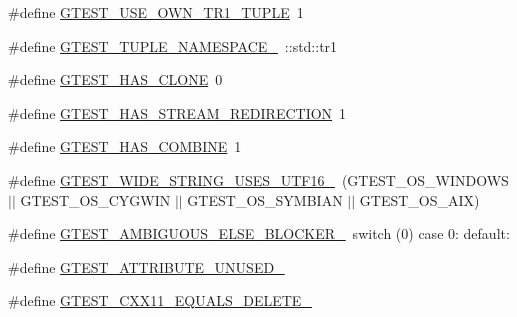 \begin{DoxyCompactItemize}
\#define \mbox{\hyperlink{_obj__test_2lib_2googletest-release-1_88_81_2googletest_2include_2gtest_2internal_2gtest-port_8h_afa144e5f5d039db0df873e7ad48c1fda}{G\+T\+E\+S\+T\+\_\+\+U\+S\+E\+\_\+\+O\+W\+N\+\_\+\+T\+R1\+\_\+\+T\+U\+P\+LE}}~1
\item 
\#define \mbox{\hyperlink{_obj__test_2lib_2googletest-release-1_88_81_2googletest_2include_2gtest_2internal_2gtest-port_8h_a2023f59bfbd8fb7148262a63bdbf0b01}{G\+T\+E\+S\+T\+\_\+\+T\+U\+P\+L\+E\+\_\+\+N\+A\+M\+E\+S\+P\+A\+C\+E\+\_\+}}~\+::std\+::tr1
\item 
\#define \mbox{\hyperlink{_obj__test_2lib_2googletest-release-1_88_81_2googletest_2include_2gtest_2internal_2gtest-port_8h_a40c075a7f969a694e59532356be59fd5}{G\+T\+E\+S\+T\+\_\+\+H\+A\+S\+\_\+\+C\+L\+O\+NE}}~0
\item 
\#define \mbox{\hyperlink{_obj__test_2lib_2googletest-release-1_88_81_2googletest_2include_2gtest_2internal_2gtest-port_8h_add695166eb7b691f93777525d5881062}{G\+T\+E\+S\+T\+\_\+\+H\+A\+S\+\_\+\+S\+T\+R\+E\+A\+M\+\_\+\+R\+E\+D\+I\+R\+E\+C\+T\+I\+ON}}~1
\item 
\#define \mbox{\hyperlink{_obj__test_2lib_2googletest-release-1_88_81_2googletest_2include_2gtest_2internal_2gtest-port_8h_a91a068d3bf6855b6f399f01836ae1482}{G\+T\+E\+S\+T\+\_\+\+H\+A\+S\+\_\+\+C\+O\+M\+B\+I\+NE}}~1
\item 
\#define \mbox{\hyperlink{_obj__test_2lib_2googletest-release-1_88_81_2googletest_2include_2gtest_2internal_2gtest-port_8h_a0e3904ca8d62334ab5f29c057dceb6a1}{G\+T\+E\+S\+T\+\_\+\+W\+I\+D\+E\+\_\+\+S\+T\+R\+I\+N\+G\+\_\+\+U\+S\+E\+S\+\_\+\+U\+T\+F16\+\_\+}}~(G\+T\+E\+S\+T\+\_\+\+O\+S\+\_\+\+W\+I\+N\+D\+O\+WS $\vert$$\vert$ G\+T\+E\+S\+T\+\_\+\+O\+S\+\_\+\+C\+Y\+G\+W\+IN $\vert$$\vert$ G\+T\+E\+S\+T\+\_\+\+O\+S\+\_\+\+S\+Y\+M\+B\+I\+AN $\vert$$\vert$ G\+T\+E\+S\+T\+\_\+\+O\+S\+\_\+\+A\+IX)
\item 
\#define \mbox{\hyperlink{_obj__test_2lib_2googletest-release-1_88_81_2googletest_2include_2gtest_2internal_2gtest-port_8h_a00b3684a621ce1422b55a0e7e8a6aecb}{G\+T\+E\+S\+T\+\_\+\+A\+M\+B\+I\+G\+U\+O\+U\+S\+\_\+\+E\+L\+S\+E\+\_\+\+B\+L\+O\+C\+K\+E\+R\+\_\+}}~switch (0) case 0\+: default\+:
\item 
\#define \mbox{\hyperlink{_obj__test_2lib_2googletest-release-1_88_81_2googletest_2include_2gtest_2internal_2gtest-port_8h_acdd47601a9376161c349a5881ccc6918}{G\+T\+E\+S\+T\+\_\+\+A\+T\+T\+R\+I\+B\+U\+T\+E\+\_\+\+U\+N\+U\+S\+E\+D\+\_\+}}
\item 
\#define \mbox{\hyperlink{_obj__test_2lib_2googletest-release-1_88_81_2googletest_2include_2gtest_2internal_2gtest-port_8h_ab229f1a8ec704ba6a97918f9239547c4}{G\+T\+E\+S\+T\+\_\+\+C\+X\+X11\+\_\+\+E\+Q\+U\+A\+L\+S\+\_\+\+D\+E\+L\+E\+T\+E\+\_\+}}
$$
\end{DoxyCompactItemize}

